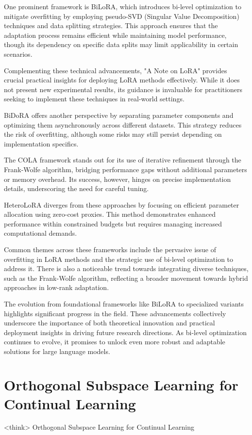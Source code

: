 \documentclass[conference]{IEEEtran}
\begin{document}
One prominent framework is BiLoRA, which introduces bi-level optimization to mitigate overfitting by employing pseudo-SVD (Singular Value Decomposition) techniques and data splitting strategies. This approach ensures that the adaptation process remains efficient while maintaining model performance, though its dependency on specific data splits may limit applicability in certain scenarios.

Complementing these technical advancements, "A Note on LoRA" provides crucial practical insights for deploying LoRA methods effectively. While it does not present new experimental results, its guidance is invaluable for practitioners seeking to implement these techniques in real-world settings.

BiDoRA offers another perspective by separating parameter components and optimizing them asynchronously across different datasets. This strategy reduces the risk of overfitting, although some risks may still persist depending on implementation specifics.

The COLA framework stands out for its use of iterative refinement through the Frank-Wolfe algorithm, bridging performance gaps without additional parameters or memory overhead. Its success, however, hinges on precise implementation details, underscoring the need for careful tuning.

HeteroLoRA diverges from these approaches by focusing on efficient parameter allocation using zero-cost proxies. This method demonstrates enhanced performance within constrained budgets but requires managing increased computational demands.

Common themes across these frameworks include the pervasive issue of overfitting in LoRA methods and the strategic use of bi-level optimization to address it. There is also a noticeable trend towards integrating diverse techniques, such as the Frank-Wolfe algorithm, reflecting a broader movement towards hybrid approaches in low-rank adaptation.

The evolution from foundational frameworks like BiLoRA to specialized variants highlights significant progress in the field. These advancements collectively underscore the importance of both theoretical innovation and practical deployment insights in driving future research directions. As bi-level optimization continues to evolve, it promises to unlock even more robust and adaptable solutions for large language models.

\section{Orthogonal Subspace Learning for Continual Learning}
<think>
Orthogonal Subspace Learning for Continual Learning
\end{document}
